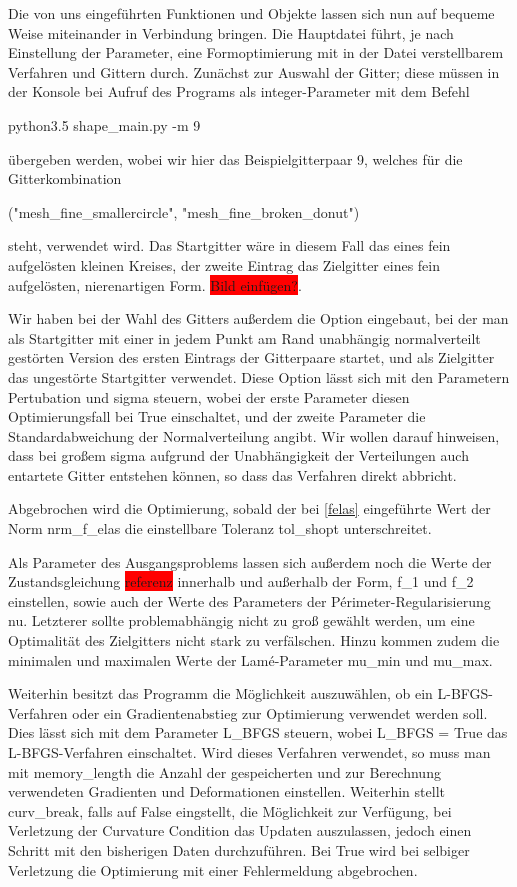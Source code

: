 \documentclass[bibliography=totoc,12pt,a4paper]{scrartcl}
\theoremstyle{exampstyle}
\numberwithin{equation}{section}
\begin{document}
Die von uns eingeführten Funktionen und Objekte lassen sich nun auf bequeme Weise miteinander in Verbindung bringen. Die Hauptdatei führt, je nach Einstellung der Parameter, eine Formoptimierung mit in der Datei verstellbarem Verfahren und Gittern durch. Zunächst zur Auswahl der Gitter; diese müssen in der Konsole bei Aufruf des Programs als \textsf{integer}-Parameter mit dem Befehl
\begin{center}
 \textsf{python3.5 shape\_main.py -m 9}
\end{center}
übergeben werden, wobei wir hier das Beispielgitterpaar 9, welches für die Gitterkombination
\begin{center}
\textsf{("mesh\_fine\_smallercircle", "mesh\_fine\_broken\_donut")}
\end{center}
steht, verwendet wird. Das Startgitter wäre in diesem Fall das eines fein aufgelösten kleinen Kreises, der zweite Eintrag das Zielgitter eines fein aufgelösten, nierenartigen Form. \colorbox{red}{Bild einfügen?}.

Wir haben bei der Wahl des Gitters außerdem die Option eingebaut, bei der man als Startgitter mit einer in jedem Punkt am Rand unabhängig normalverteilt gestörten Version des ersten Eintrags der Gitterpaare startet, und als Zielgitter das ungestörte Startgitter verwendet. Diese Option lässt sich mit den Parametern \textsf{Pertubation} und \textsf{sigma} steuern, wobei der erste Parameter diesen Optimierungsfall bei \textsf{True} einschaltet, und der zweite Parameter die Standardabweichung der Normalverteilung angibt. Wir wollen darauf hinweisen, dass bei großem \textsf{sigma} aufgrund der Unabhängigkeit der Verteilungen auch entartete Gitter entstehen können, so dass das Verfahren direkt abbricht.

Abgebrochen wird die Optimierung, sobald der bei \ref{felas} eingeführte Wert der Norm \textsf{nrm\_f\_elas} die einstellbare Toleranz \textsf{tol\_shopt} unterschreitet.

Als Parameter des Ausgangsproblems lassen sich außerdem noch die Werte der Zustandsgleichung \colorbox{red}{referenz} innerhalb und außerhalb der Form, \textsf{f\_1} und \textsf{f\_2} einstellen, sowie auch der Werte des Parameters der Périmeter-Regularisierung \textsf{nu}. Letzterer sollte problemabhängig nicht zu groß gewählt werden, um eine Optimalität des Zielgitters nicht stark zu verfälschen. Hinzu kommen zudem die minimalen und maximalen Werte der Lamé-Parameter \textsf{mu\_min} und \textsf{mu\_max}.

Weiterhin besitzt das Programm die Möglichkeit auszuwählen, ob ein L-BFGS-Verfahren oder ein Gradientenabstieg zur Optimierung verwendet werden soll. Dies lässt sich mit dem Parameter \textsf{L\_BFGS} steuern, wobei \textsf{L\_BFGS = True} das L-BFGS-Verfahren einschaltet. Wird dieses Verfahren verwendet, so muss man mit \textsf{memory\_length} die Anzahl der gespeicherten und zur Berechnung verwendeten Gradienten und Deformationen einstellen. Weiterhin stellt \textsf{curv\_break}, falls auf \textsf{False} eingstellt, die Möglichkeit zur Verfügung, bei Verletzung der Curvature Condition das Updaten auszulassen, jedoch einen Schritt mit den bisherigen Daten durchzuführen. Bei \textsf{True} wird bei selbiger Verletzung die Optimierung mit einer Fehlermeldung abgebrochen.
\end{document}
